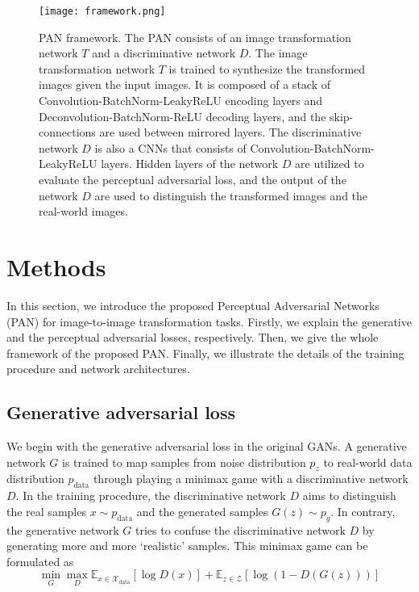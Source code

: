 \documentclass{article}
\begin{document}
\begin{figure*}[!t]
\centering
\texttt{[image: framework.png]}%
\caption{PAN framework. The PAN consists of an image transformation network $T$ and a discriminative network $D$. The image transformation network $T$ is trained to synthesize the transformed images given the input images. It is composed of a stack of Convolution-BatchNorm-LeakyReLU encoding layers and Deconvolution-BatchNorm-ReLU decoding layers, and the skip-connections are used between mirrored layers. The discriminative network $D$ is also a CNNs that consists of Convolution-BatchNorm-LeakyReLU layers. Hidden layers of the network $D$ are utilized to evaluate the perceptual adversarial loss, and the output of the network $D$ are used to distinguish the transformed images and the real-world images.}
\label{framework}
\end{figure*}

\section{Methods}
\label{sec:methods}
In this section, we introduce the proposed Perceptual Adversarial Networks (PAN) for image-to-image transformation tasks. Firstly, we explain the generative and the perceptual adversarial losses, respectively. Then, we give the whole framework of the proposed PAN. Finally, we illustrate the details of the training procedure and network architectures. 

\subsection{Generative adversarial loss}
We begin with the generative adversarial loss in the original GANs. A generative network $G$ is trained to map samples from noise distribution $p_z$ to real-world data distribution $p_\text{data}$ through playing a minimax game with a discriminative network $D$. In the training procedure, the discriminative network $D$ aims to distinguish the real samples $x \sim p_\text{data}$ and the generated samples $G(z) \sim p_g$. In contrary, the generative network $G$ tries to confuse the discriminative network $D$ by generating more and more `realistic' samples. This minimax game can be formulated as
\begin{equation}
\min_G \max_D \mathbb{E}_{x \in \mathcal{X}_\text{data}}[\log D(x)] +\mathbb{E}_{z \in \mathcal{Z}} [\log (1-D(G(z)))]
\end{equation} 
\end{document}
